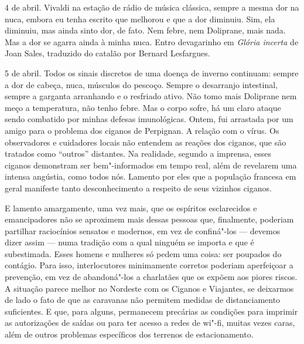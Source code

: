 4 de abril. Vivaldi na estação de rádio de música clássica, sempre a
mesma dor na nuca, embora eu tenha escrito que melhorou e que a dor
diminuiu. Sim, ela diminuiu, mas ainda sinto dor, de fato. Nem febre,
nem Doliprane, mais nada. Mas a dor se agarra ainda à minha nuca. Entro
devagarinho em \emph{Glória incerta} de Joan Sales, traduzido do catalão
por Bernard Lesfargues.

5 de abril. Todos os sinais discretos de uma doença de inverno
continuam: sempre a dor de cabeça, nuca, músculos do pescoço. Sempre o
desarranjo intestinal, sempre a garganta arranhando e o resfriado ativo.
Não tomo mais Doliprane nem meço a temperatura, não tenho febre. Mas o
corpo sofre, há um claro ataque sendo combatido por minhas defesas
imunológicas. Ontem, fui arrastada por um amigo para o problema dos
ciganos de Perpignan. A relação com o vírus. Os observadores e
cuidadores locais não entendem as reações dos ciganos, que são tratados
como ``outros'' distantes. Na realidade, segundo a imprensa, esses
ciganos demonstram ser bem"-informados em tempo real, além de revelarem
uma intensa angústia, como todos nós. Lamento por eles que a população
francesa em geral manifeste tanto desconhecimento a respeito de seus
vizinhos ciganos.

E lamento amargamente, uma vez mais, que os espíritos esclarecidos e
emancipadores não se aproximem mais dessas pessoas que, finalmente,
poderiam partilhar raciocínios sensatos e modernos, em vez de
confiná"-los --- devemos dizer assim --- numa tradição com a qual ninguém
se importa e que é subestimada. Esses homens e mulheres só pedem uma
coisa: ser poupados do contágio. Para isso, interlocutores minimamente
corretos poderiam aperfeiçoar a prevenção, em vez de abandoná"-los a
charlatães que os expõem aos piores riscos. A situação parece melhor no
Nordeste com os Ciganos e Viajantes, se deixarmos de lado o fato de que
as caravanas não permitem medidas de distanciamento suficientes. E que,
para alguns, permanecem precárias as condições para imprimir as
autorizações de saídas ou para ter acesso a redes de wi"-fi, muitas vezes
caras, além de outros problemas específicos dos terrenos de
estacionamento.

